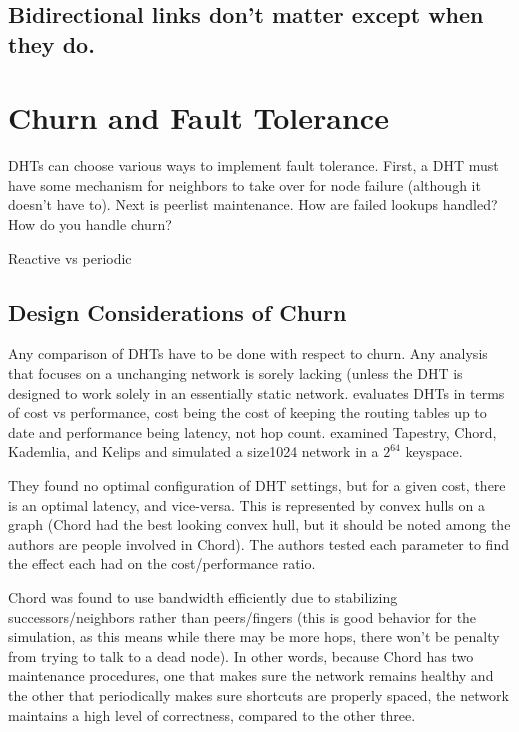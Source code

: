 \documentclass[10pt,letterpaper]{report}
\begin{document}
\subsection{Bidirectional links don't matter except when they do.}

\section{Churn and Fault Tolerance}  %

DHTs can choose various ways to implement fault tolerance.  First, a DHT must have some mechanism for neighbors to take over for node failure (although it doesn't have to).  Next is peerlist maintenance.  How are failed lookups handled?  How do you handle churn?


Reactive vs periodic


\subsection{Design Considerations of Churn}

Any comparison of DHTs have to be done with respect to churn.    Any analysis  that focuses on a unchanging network is sorely lacking (unless the DHT is designed to work solely in an essentially static network. \cite{lichurn}  evaluates DHTs in terms of cost vs performance, cost being the cost of keeping the routing tables up to date and performance being latency, not hop count.  \cite{lichurn} examined Tapestry, Chord, Kademlia, and Kelips and simulated a size1024 network in a $2^64$ keyspace.   

They found no optimal configuration of DHT settings, but for a given cost, there is an optimal latency, and vice-versa.  This is represented by convex hulls on a graph (Chord had the best looking convex hull, but it should be noted among the authors are people involved in Chord).   The authors tested each parameter to find the effect each had on the cost/performance ratio.

Chord was found to use bandwidth efficiently due to stabilizing successors/neighbors rather than peers/fingers  (this is good behavior for the simulation, as this means while there may be more hops, there won't be penalty from trying to talk to a dead node).  In other words, because Chord has two maintenance procedures, one that makes sure the network remains healthy and the other that periodically makes sure shortcuts are properly spaced, the network maintains a high level of correctness, compared to the other three.
\end{document}
